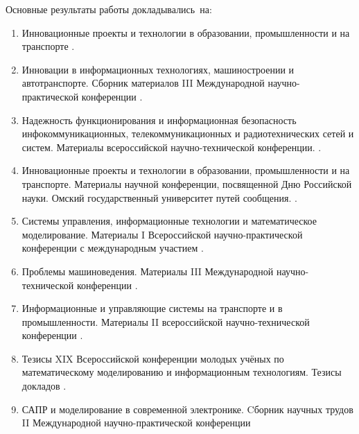 {\probation}
Основные результаты работы докладывались~на:
\begin{enumerate}
\item Инновационные проекты и технологии в образовании, промышленности и на транспорте \cite{comparative_study2020}.  

\item Инновации в информационных технологиях, машиностроении и автотранспорте. Сборник материалов III Международной научно-практической конференции \cite{complexity_assessment2019}.

\item Надежность функционирования и информационная безопасность инфокоммуникационных, телекоммуникационных и радиотехнических сетей и систем. Материалы всероссийской научно-технической конференции. \cite{modern_information2019}. 

\item Инновационные проекты и технологии в образовании, промышленности и на транспорте. Материалы научной конференции, посвященной Дню Российской науки. Омский государственный университет путей сообщения. \cite{comparative_analysis2019}.

\item Системы управления, информационные технологии и математическое моделирование. Материалы I Всероссийской научно-практической конференции с международным участием \cite{comparative_analysis}.

\item Проблемы машиноведения. Материалы III Международной научно-технической конференции \cite{cache_oriented2019}.

\item Информационные и управляющие системы на транспорте и в промышленности. Материалы II всероссийской научно-технической конференции \cite{accuracy_study2018}.

\item Тезисы XIX Всероссийской конференции молодых учёных по математическому моделированию и информационным технологиям. Тезисы докладов \cite{efficiency_mark2018}.

\item  САПР и моделирование в современной электронике. Cборник научных трудов II Международной научно-практической конференции \cite{information-measuring2018}

\end{enumerate}

